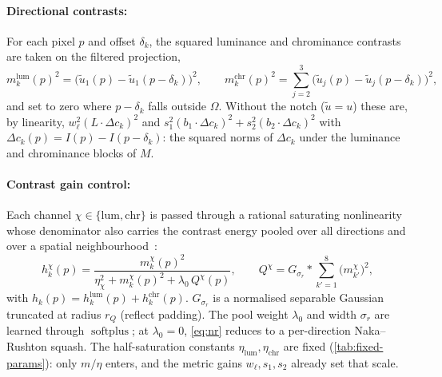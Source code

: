 \documentclass[11pt,a4paper]{article}
\newcommand{\softplus}{\operatorname{softplus}}
\begin{document}
\paragraph{Directional contrasts:}
For each pixel $p$ and offset $\delta_k$, the squared luminance and chrominance contrasts are taken on the filtered projection,
\begin{equation}\label{eq:dlumchr}
  m_k^{\mathrm{lum}}(p)^2 = \bigl(\tilde u_1(p) - \tilde u_1(p - \delta_k)\bigr)^2,
  \qquad
  m_k^{\mathrm{chr}}(p)^2 = \sum_{j=2}^{3} \bigl(\tilde u_j(p) - \tilde u_j(p - \delta_k)\bigr)^2,
\end{equation}
and set to zero where $p - \delta_k$ falls outside $\Omega$. Without the notch ($\tilde u = u$) these are, by linearity, $w_\ell^2 (L \cdot \Delta c_k)^2$ and $s_1^2 (b_1 \cdot \Delta c_k)^2 + s_2^2 (b_2 \cdot \Delta c_k)^2$ with $\Delta c_k(p) = I(p) - I(p - \delta_k)$: the squared norms of $\Delta c_k$ under the luminance and chrominance blocks of $M$.

\paragraph{Contrast gain control:}
Each channel $\chi \in \{\mathrm{lum}, \mathrm{chr}\}$ is passed through a rational saturating nonlinearity~\cite{naka1966srod} whose denominator also carries the contrast energy pooled over all directions and over a spatial neighbourhood~\cite{heeger1992normalisation}:
\begin{equation}\label{eq:nr}
  h_k^{\chi}(p) = \frac{m_k^{\chi}(p)^2}
                    {\eta_\chi^2 + m_k^{\chi}(p)^2 + \lambda_0\, Q^{\chi}(p)},
  \qquad
  Q^{\chi} = G_{\sigma_r} * \sum_{k'=1}^{8} \bigl(m_{k'}^{\chi}\bigr)^2,
\end{equation}
with $h_k(p) = h_k^{\mathrm{lum}}(p) + h_k^{\mathrm{chr}}(p)$. $G_{\sigma_r}$ is a normalised separable Gaussian truncated at radius $r_Q$ (reflect padding). The pool weight $\lambda_0$ and width $\sigma_r$ are learned through $\softplus$; at $\lambda_0 = 0$, \cref{eq:nr} reduces to a per-direction Naka--Rushton squash. The half-saturation constants $\eta_{\mathrm{lum}}, \eta_{\mathrm{chr}}$ are fixed (\cref{tab:fixed-params}): only $m/\eta$ enters, and the metric gains $w_\ell, s_1, s_2$ already set that scale.
\end{document}
